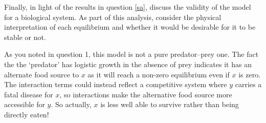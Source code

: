 \documentclass[a4paper,12pt]{article}
\begin{document}
\begin{enumerate}
    \question{}
    { %
    Finally, in light of the results in question \ref{sa}, discuss the validity of the model for a biological system. As part of this analysis, consider the physical interpretation of each equilibrium and whether it would be desirable for it to be stable or not. 
    }
    {%
    
   As you noted in question 1, this model is not a pure predator--prey one. The fact the the `predator' has logistic growth in the absence of prey indicates it has an alternate food source to $x$ as it will reach a non-zero equilibrium even if $x$ is zero. The interaction terms could instead reflect a competitive system where $y$ carries a fatal disease for $x$, so interactions make the alternative food source more accessible for $y$. So actually, $x$ is less well able to survive rather than being directly eaten!
    
}
\end{enumerate}
\end{document}
